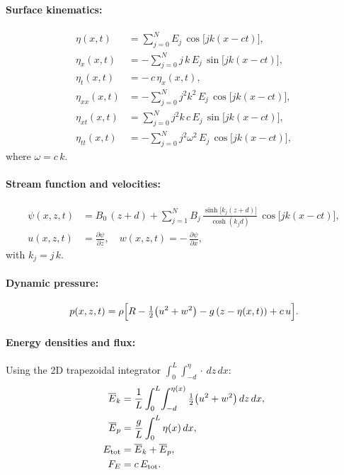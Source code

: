 \documentclass{article}
\begin{document}
\paragraph{Surface kinematics:}
\begin{align}
\eta(x,t) &= \sum_{j=0}^{N} E_{j}\,\cos\bigl[jk(x - ct)\bigr], \\[0.5ex]
\eta_{x}(x,t) &= -\sum_{j=0}^{N} j\,k\,E_{j}\,\sin\bigl[jk(x - ct)\bigr], \\[0.5ex]
\eta_{t}(x,t) &= -\,c\,\eta_{x}(x,t), \\[0.5ex]
\eta_{xx}(x,t) &= -\sum_{j=0}^{N} j^{2}k^{2}\,E_{j}\,\cos\bigl[jk(x - ct)\bigr], \\[0.5ex]
\eta_{xt}(x,t) &= \sum_{j=0}^{N} j^{2}k\,c\,E_{j}\,\sin\bigl[jk(x - ct)\bigr], \\[0.5ex]
\eta_{tt}(x,t) &= -\sum_{j=0}^{N} j^{2}\omega^{2}\,E_{j}\,\cos\bigl[jk(x - ct)\bigr],
\end{align}
where \(\omega = c\,k\).

\paragraph{Stream function and velocities:}
\begin{align}
\psi(x,z,t) 
&= B_{0}\,(z + d) 
   + \sum_{j=1}^{N} B_{j}\,
     \frac{\sinh\!\bigl[k_{j}(z + d)\bigr]}{\cosh(k_{j}d)}\,
     \cos\bigl[jk(x - ct)\bigr], 
   \\[0.5ex]
u(x,z,t) &= \frac{\partial \psi}{\partial z}, 
\quad
w(x,z,t) = -\,\frac{\partial \psi}{\partial x},
\end{align}
with \(k_{j}=j\,k\).

\paragraph{Dynamic pressure:}
\begin{equation}
p(x,z,t)
= \rho\Bigl[R - \tfrac12\bigl(u^{2}+w^{2}\bigr) - g\,(z - \eta(x,t)) + c\,u\Bigr].
\end{equation}

\paragraph{Energy densities and flux:}  
Using the 2D trapezoidal integrator \(\int_{0}^{L}\!\int_{-d}^{\eta}\!\cdot\,dz\,dx\):
\begin{align}
\overline{E}_{k} 
&= \frac{1}{L}\int_{0}^{L}\!\int_{-d}^{\eta(x)} \tfrac12\bigl(u^{2}+w^{2}\bigr)\,dz\,dx, 
\\
\overline{E}_{p} 
&= \frac{g}{L}\int_{0}^{L} \eta(x)\,dx, 
\\
E_{\rm tot} 
&= \overline{E}_{k} + \overline{E}_{p}, 
\\
F_{E} 
&= c\,E_{\rm tot}.
\end{align}
\end{document}
